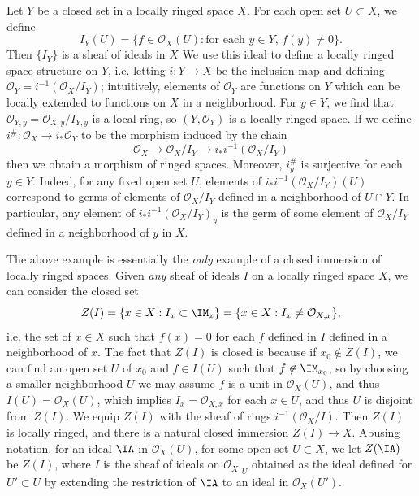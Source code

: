 \begin{example}
    Let $Y$ be a closed set in a locally ringed space $X$. For each open set $U \subset X$, we define
    \[ I_Y(U) = \{ f \in \mathcal{O}_X(U): \text{for each $y \in Y$, $f(y) \neq 0$} \}. \]
    Then $\{ I_Y \}$ is a sheaf of ideals in $X$ We use this ideal to define a locally ringed space structure on $Y$, i.e. letting $i: Y \to X$ be the inclusion map and defining $\mathcal{O}_Y = i^{-1}(\mathcal{O}_X / I_Y)$; intuitively, elements of $\mathcal{O}_Y$ are functions on $Y$ which can be locally extended to functions on $X$ in a neighborhood. For $y \in Y$, we find that $\mathcal{O}_{Y,y} = \mathcal{O}_{X,y} / I_{Y,y}$ is a local ring, so $(Y,\mathcal{O}_Y)$ is a locally ringed space. If we define $i^\#: \mathcal{O}_X \to i_* \mathcal{O}_Y$ to be the morphism induced by the chain
    \[ \mathcal{O}_X \to \mathcal{O}_X / I_Y \to i_* i^{-1} (\mathcal{O}_X / I_Y) \]
    then we obtain a morphism of ringed spaces. Moreover, $i^\#_y$ is surjective for each $y \in Y$. Indeed, for any fixed open set $U$, elements of $i_* i^{-1} (\mathcal{O}_X / I_Y) (U)$ correspond to germs of elements of $ \mathcal{O}_X / I_Y$ defined in a neighborhood of $U \cap Y$. In particular, any element of $i_* i^{-1}(\mathcal{O}_X / I_Y)_y$ is the germ of some element of $\mathcal{O}_X / I_Y$ defined in a neighborhood of $y$ in $X$.
\end{example}

The above example is essentially the \emph{only} example of a closed immersion of locally ringed spaces. Given \emph{any} sheaf of ideals $I$ on a locally ringed space $X$, we can consider the closed set
%
\[ Z(I) = \{ x \in X: I_x \subset \IM_x \} = \{ x \in X : I_x \neq \mathcal{O}_{X,x} \}, \]
%
i.e. the set of $x \in X$ such that $f(x) = 0$ for each $f$ defined in $I$ defined in a neighborhood of $x$. The fact that $Z(I)$ is closed is because if $x_0 \not \in Z(I)$, we can find an open set $U$ of $x_0$ and $f \in I(U)$ such that $f \not \in \IM_{x_0}$, so by choosing a smaller neighborhood $U$ we may assume $f$ is a unit in $\mathcal{O}_X(U)$, and thus $I(U) = \mathcal{O}_X(U)$, which implies $I_x = \mathcal{O}_{X,x}$ for each $x \in U$, and thus $U$ is disjoint from $Z(I)$. We equip $Z(I)$ with the sheaf of rings $i^{-1} (\mathcal{O}_X / I)$. Then $Z(I)$ is locally ringed, and there is a natural closed immersion $Z(I) \to X$. Abusing notation, for an ideal $\IA$ in $\mathcal{O}_X(U)$, for some open set $U \subset X$, we let $Z(\IA)$ be $Z(I)$, where $I$ is the sheaf of ideals on $\mathcal{O}_X|_U$ obtained as the ideal defined for $U' \subset U$ by extending the restriction of $\IA$ to an ideal in $\mathcal{O}_X(U')$.

